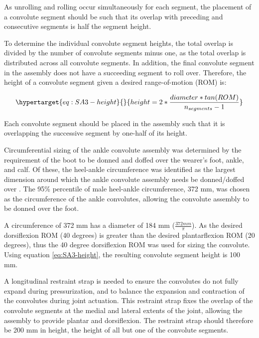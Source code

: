 \documentclass[defaultstyle,11pt]{comps}
\begin{document}
As unrolling and rolling occur simultaneously for each segment, the placement of a convolute segment should be such that its overlap with preceding and consecutive segments is half the segment height.

To determine the individual convolute segment heights, the total overlap is divided by the number of convolute segments minus one, as the total overlap is distributed across all convolute segments.
In addition, the final convolute segment in the assembly does not have a succeeding segment to roll over.
Therefore, the height of a convolute segment given a desired range-of-motion (ROM) is:

\begin{equation}\protect\hypertarget{eq:SA3-height}{}{
height = 2*\frac{diameter * tan(ROM)}{n_{segments}-1}
}\label{eq:SA3-height}\end{equation}

Each convolute segment should be placed in the assembly such that it is overlapping the successive segment by one-half of its height.

Circumferential sizing of the ankle convolute assembly was determined by the requirement of the boot to be donned and doffed over the wearer's foot, ankle, and calf.
Of these, the heel-ankle circumference was identified as the largest dimension around which the ankle convolute assembly needs be donned/doffed over \citep{Gordon2014}.
The 95\% percentile of male heel-ankle circumference, 372 mm, was chosen as the circumference of the ankle convolutes, allowing the convolute assembly to be donned over the foot.

A circumference of 372 mm has a diameter of 184 mm (\(\frac{372mm}{\pi}\)).
As the desired dorsiflexion ROM (40 degrees) is greater than the desired plantarflexion ROM (20 degrees), thus the 40 degree dorsiflexion ROM was used for sizing the convolute.
Using equation \ref{eq:SA3-height}, the resulting convolute segment height is 100 mm.

A longitudinal restraint strap is needed to ensure the convolutes do not fully expand during pressurization, and to balance the expansion and contraction of the convolutes during joint actuation.
This restraint strap fixes the overlap of the convolute segments at the medial and lateral extents of the joint, allowing the assembly to provide plantar and dorsiflexion.
The restraint strap should therefore be 200 mm in height, the height of all but one of the convolute segments.
\end{document}
